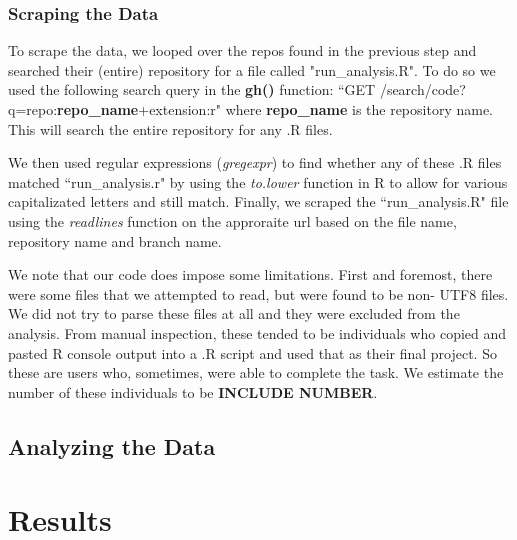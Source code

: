\documentclass[12pt]{article}\usepackage[]{graphicx}\usepackage[]{color}
\begin{document}
\subsubsection{Scraping the Data}

To scrape the data, we looped over the repos found in the previous step and searched their (entire) repository for a file 
called "run\_analysis.R". To do so we used the following search query in the \textbf{gh()} function: 
``GET /search/code?q=repo:\textbf{repo\_name}+extension:r" where \textbf{repo\_name} is the repository name. 
This will search the entire repository for any .R files. 

We then used regular expressions ({\it gregexpr}) to find whether 
any of these .R files matched ``run\_analysis.r" by using the {\it to.lower}
function in R to allow for various capitalizated letters and 
still match. Finally, we scraped the ``run\_analysis.R" file using the {\it readlines} 
function on the approraite url based on the file name, repository name 
and branch name.

We note that our code does impose some limitations. First and foremost, there were some files that we attempted to read, but 
were found to be non- UTF8 files. We did not try to parse these files at all and they were excluded from the analysis. 
From manual inspection, these tended to be individuals who copied and pasted R console output into a .R script and used that as 
their final project. So these are users who, sometimes, were able to complete the task. 
We estimate the number of these individuals to be \textbf{INCLUDE NUMBER}.




\subsection{Analyzing the Data}








\section{Results}
\end{document}
